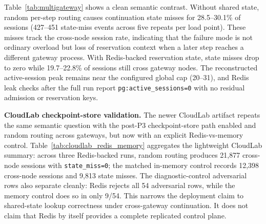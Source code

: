 \documentclass[sigconf,review,anonymous]{acmart}
\begin{document}
Table~\ref{tab:multigateway} shows a clean semantic contrast.
Without shared state, random per-step routing causes continuation state misses for 28.5--30.1\% of sessions (427--451 state-miss events across five repeats per load point).
These misses track the cross-node session rate, indicating that the failure mode is not ordinary overload but loss of reservation context when a later step reaches a different gateway process.
With Redis-backed reservation state, state misses drop to zero while 19.7--22.8\% of sessions still cross gateway nodes.
The reconstructed active-session peak remains near the configured global cap (20--31), and Redis leak checks after the full run report \texttt{pg:active\_sessions=0} with no residual admission or reservation keys.

\textbf{CloudLab checkpoint-store validation.}
The newer CloudLab artifact repeats the same semantic question with the post-P3 checkpoint-store path enabled and random routing across gateways, but now with an explicit Redis-vs-memory control. Table~\ref{tab:cloudlab_redis_memory} aggregates the lightweight CloudLab summary: across three Redis-backed runs, random routing produces 21{,}877 cross-node sessions with \texttt{state\_miss=0}; the matched in-memory control records 12{,}398 cross-node sessions and 9{,}813 state misses. The diagnostic-control adversarial rows also separate cleanly: Redis rejects all 54 adversarial rows, while the memory control does so in only 9/54. This narrows the deployment claim to shared-state lookup correctness under cross-gateway continuation. It does not claim that Redis by itself provides a complete replicated control plane.

\begin{table}[t]
\centering
\caption{CloudLab random-routing Redis-vs-memory shared-state check from \texttt{artifact\_results/cloudlab\_random\_redis\_memory\_v1}. The Redis arm is the correctness arm; the in-memory arm is the diagnostic control.}
\label{tab:cloudlab_redis_memory}
\small
{}
\end{table}
\end{document}
